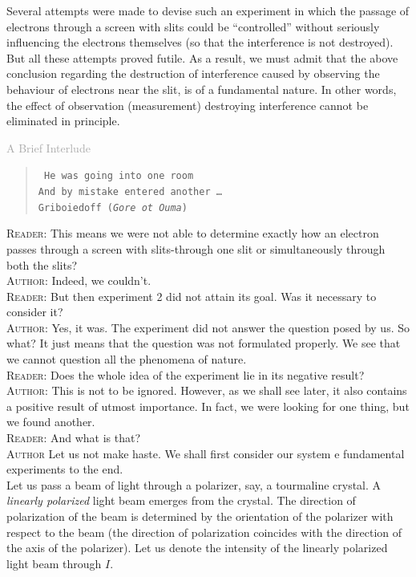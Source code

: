 \documentclass[a4paper,sfsidenotes,colorlinks=true]{tufte-book}
\numberwithin{equation}{section}
\numberwithin{figure}{section}
\begin{document}
Several attempts were made to devise such an experiment in which the passage of electrons through a screen with slits could be ``controlled'' without seriously influencing the electrons themselves (so that the interference is not destroyed). But all these attempts proved futile. As a result, we must admit that the above conclusion regarding the destruction of interference caused by observing the behaviour of electrons near the slit, is of a fundamental nature. In other words, the effect of observation (measurement) destroying interference cannot be eliminated in principle.

\clearpage

\textsf{\Large \textcolor{darkgray}{A Brief Interlude}}

\vspace*{10pt}
\begin{verse}
\texttt{\small
He was going into one room \\
And by mistake entered another \ldots \\[5pt]
Griboiedoff (\emph{Gore ot Ouma})}
\end{verse}

\textsc{Reader}: This means we were not able to determine exactly how an electron passes through a screen with slits-through one slit or simultaneously through both the slits?
\\
\textsc{Author}: Indeed, we couldn't.
\\
\textsc{Reader}: But then experiment 2 did not attain its goal. Was it necessary to consider it?
\\
\textsc{Author}: Yes, it was. The experiment did not answer the question posed by us. So what? It just means that the question was not formulated properly. We see that we cannot question all the phenomena of nature. 
\\
\textsc{Reader}: Does the whole idea of the experiment lie in its negative result? 
\\
\textsc{Author}: This is not to be ignored. However, as we shall see later, it also contains a positive result of utmost importance. In fact, we were looking for one thing, but we found another.
\\
\textsc{Reader}: And what is that?
\\
\textsc{Author} Let us not make haste. We shall first consider our system e fundamental experiments to the end.\\[10pt]

Let  us pass a beam of light through a polarizer, say, a tourmaline crystal. A \emph{linearly polarized} light beam emerges from the crystal. The direction of polarization of the beam is determined by the orientation of the polarizer with respect to the beam (the direction of polarization coincides with the direction of the axis of the polarizer). Let us denote the intensity of the linearly polarized light beam through $I$. 
\end{document}
